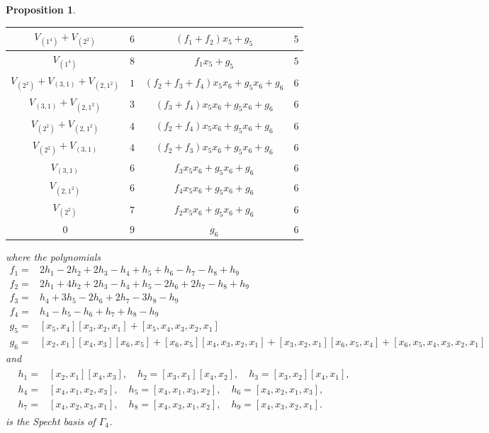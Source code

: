 \documentclass{amsart}
\newtheorem{prop}[thm]{Proposition}
\theoremstyle{definition}
\theoremstyle{remark}
\numberwithin{equation}{section}
\begin{document}
\begin{prop}
\begin{enumerate}
\begin{center}
\begin{tabular}{|c|c|c|c|}
$V_{(1^4)}+V_{(2^2)}$             & $6$ & $(f_1+f_2)x_5+g_5$                & $5$ \\ \hline
$V_{(1^4)}$                       & $8$ & $f_1x_5+g_5$                      & $5$ \\ \hline
$V_{(2^2)}+V_{(3,1)}+V_{(2,1^2)}$ & $1$ &  $(f_2+f_3+f_4)x_5x_6+g_5x_6+g_6$ & $6$ \\ \hline
$V_{(3,1)}+V_{(2,1^2)}$           & $3$ & $(f_3+f_4)x_5x_6+g_5x_6+g_6$      & $6$ \\ \hline
$V_{(2^2)}+V_{(2,1^2)}$           & $4$ &  $(f_2+f_4)x_5x_6+g_5x_6+g_6$     & $6$ \\ \hline
$V_{(2^2)}+V_{(3,1)}$             & $4$ & $(f_2+f_3)x_5x_6+g_5x_6+g_6$      & $6$ \\ \hline
$V_{(3,1)}$                       & $6$ &  $f_3x_5x_6+g_5x_6+g_6$           & $6$ \\ \hline
$V_{(2,1^2)}$                     & $6$ & $f_4x_5x_6+g_5x_6+g_6$            & $6$ \\ \hline
$V_{(2^2)}$                       & $7$ & $f_2x_5x_6+g_5x_6+g_6$            & $6$ \\ \hline
$0$                               & $9$ & $g_6$                             & $6$ \\ \hline
\end{tabular}
\end{center}
where the polynomials
\begin{align*}
f_1=& 2h_1-2h_2+2h_3-h_4+h_5+h_6-h_7-h_8+h_9\\
f_2=& 2h_1+4h_2+2h_3-h_4+h_5-2h_6+2h_7-h_8+h_9\\
f_3=& h_4+3h_5-2h_6+2h_7-3h_8-h_9\\
f_4=& h_4-h_5-h_6+h_7+h_8-h_9\\
g_5=& [x_5, x_4][x_3, x_2, x_1]+[x_5, x_4, x_3, x_2, x_1]\\
g_6=& [x_2, x_1][x_4, x_3][x_6, x_5]+[x_6, x_5][x_4, x_3, x_2, x_1]+[x_3, x_2, x_1][x_6, x_5, x_4]+[x_6, x_5, x_4, x_3, x_2, x_1]
\end{align*}
and 
\begin{align*}
	\begin{split}
		h_1=& [x_2, x_1][x_4, x_3], \quad 
		h_2= [x_3, x_1][x_4, x_2], \quad 
		h_3= [x_3, x_2][x_4, x_1], \\
		h_4=& [x_4, x_1, x_2, x_3], \quad
		h_5= [x_4, x_1, x_3, x_2], \quad 
		h_6= [x_4, x_2, x_1, x_3], \\
		h_7=& [x_4, x_2, x_3, x_1], \quad
		h_8= [x_4, x_3, x_1, x_2], \quad
		h_9= [x_4, x_3, x_2, x_1]. 
	\end{split}
\end{align*}
is the Specht basis of $\Gamma_4$. 
\end{enumerate}
\end{prop}
\end{document}
